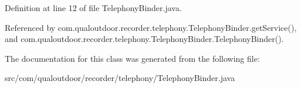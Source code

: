 Definition at line 12 of file Telephony\-Binder.\-java.



Referenced by com.\-qualoutdoor.\-recorder.\-telephony.\-Telephony\-Binder.\-get\-Service(), and com.\-qualoutdoor.\-recorder.\-telephony.\-Telephony\-Binder.\-Telephony\-Binder().



The documentation for this class was generated from the following file\-:\begin{DoxyCompactItemize}
\item 
src/com/qualoutdoor/recorder/telephony/Telephony\-Binder.\-java\end{DoxyCompactItemize}
